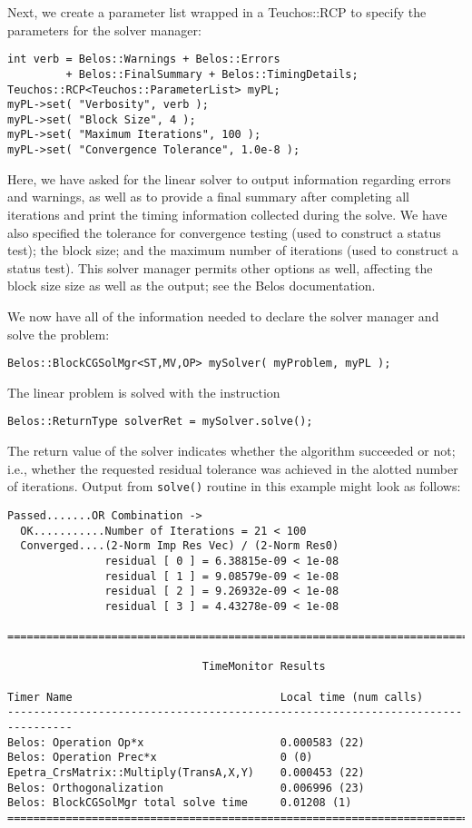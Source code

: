 Next, we create a parameter list wrapped in a Teuchos::\-RCP to specify the 
parameters for the solver manager:
\begin{verbatim}
int verb = Belos::Warnings + Belos::Errors 
         + Belos::FinalSummary + Belos::TimingDetails;
Teuchos::RCP<Teuchos::ParameterList> myPL;
myPL->set( "Verbosity", verb );
myPL->set( "Block Size", 4 );
myPL->set( "Maximum Iterations", 100 );
myPL->set( "Convergence Tolerance", 1.0e-8 );
\end{verbatim}

Here, we have asked for the linear solver to output information regarding errors and
warnings, as well as to provide a final summary after completing all iterations and
print the timing information collected during the solve. We have also specified the
tolerance for convergence testing (used to construct a status test); the block size; 
and the maximum number of iterations (used to construct a status test).
This solver manager permits other options as well, affecting the
block size size as well as the output; see the Belos documentation.

We now have all of the information needed to declare the solver manager and solve the
problem:
\begin{verbatim}
Belos::BlockCGSolMgr<ST,MV,OP> mySolver( myProblem, myPL );
\end{verbatim}
The linear problem is solved with the instruction
\begin{verbatim}
Belos::ReturnType solverRet = mySolver.solve();
\end{verbatim}

The return value of the solver indicates whether the algorithm succeeded or not; i.e.,
whether the requested residual tolerance was achieved in the alotted number of iterations.
Output from \verb!solve()! routine in this example might look as follows:
\begin{verbatim}
Passed.......OR Combination ->
  OK...........Number of Iterations = 21 < 100
  Converged....(2-Norm Imp Res Vec) / (2-Norm Res0)
               residual [ 0 ] = 6.38815e-09 < 1e-08
               residual [ 1 ] = 9.08579e-09 < 1e-08
               residual [ 2 ] = 9.26932e-09 < 1e-08
               residual [ 3 ] = 4.43278e-09 < 1e-08

================================================================================

                              TimeMonitor Results

Timer Name                                Local time (num calls)
--------------------------------------------------------------------------------
Belos: Operation Op*x                     0.000583 (22)
Belos: Operation Prec*x                   0 (0)
Epetra_CrsMatrix::Multiply(TransA,X,Y)    0.000453 (22)
Belos: Orthogonalization                  0.006996 (23)
Belos: BlockCGSolMgr total solve time     0.01208 (1)
================================================================================
\end{verbatim}

